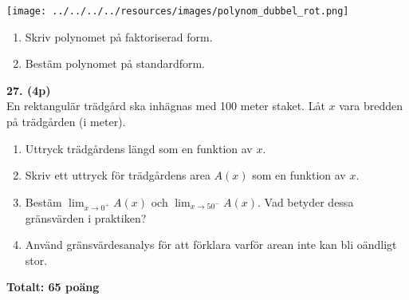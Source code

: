 \documentclass[12pt]{article}
\begin{document}
\begin{center}
\texttt{[image: ../../../../resources/images/polynom\_dubbel\_rot.png]}
\end{center}

\begin{enumerate}[label=\alph*)]
    \item Skriv polynomet på faktoriserad form.
    \item Bestäm polynomet på standardform.
\end{enumerate}

\vspace{0.5cm}

\newpage
\noindent
\textbf{27. (4p)} \\
En rektangulär trädgård ska inhägnas med 100 meter staket. Låt $x$ vara bredden på trädgården (i meter).

\begin{enumerate}[label=\alph*)]
    \item Uttryck trädgårdens längd som en funktion av $x$.
    \item Skriv ett uttryck för trädgårdens area $A(x)$ som en funktion av $x$.
    \item Bestäm $\lim_{x \to 0^+} A(x)$ och $\lim_{x \to 50^-} A(x)$. Vad betyder dessa gränsvärden i praktiken?
    \item Använd gränsvärdesanalys för att förklara varför arean inte kan bli oändligt stor.
\end{enumerate}

\vspace{1cm}

\begin{center}
\textbf{Totalt: 65 poäng}
\end{center}
\end{document}
